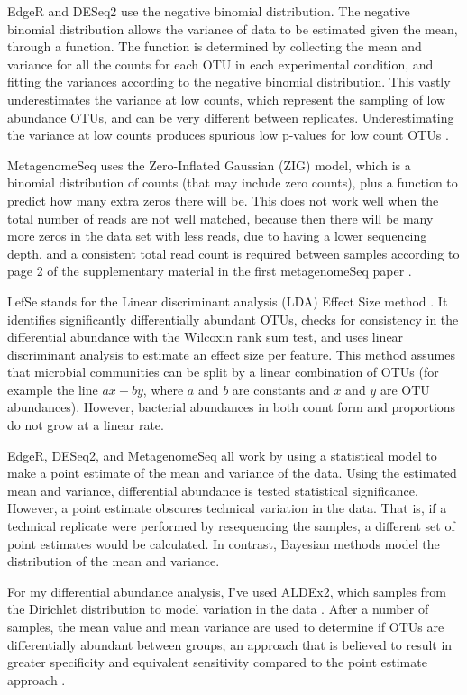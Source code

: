EdgeR and DESeq2 use the negative binomial distribution. The negative binomial distribution allows the variance of data to be estimated given the mean, through a function. The function is determined by collecting the mean and variance for all the counts for each OTU in each experimental condition, and fitting the variances according to the negative binomial distribution. This vastly underestimates the variance at low counts, which represent the sampling of low abundance OTUs, and can be very different between replicates. Underestimating the variance at low counts produces spurious low p-values for low count OTUs \cite{fernandes2013anova}.

MetagenomeSeq uses the Zero-Inflated Gaussian (ZIG) model, which is a binomial distribution of counts (that may include zero counts), plus a function to predict how many extra zeros there will be. This does not work well when the total number of reads are not well matched, because then there will be many more zeros in the data set with less reads, due to having a lower sequencing depth, and a consistent total read count is required between samples according to page 2 of the supplementary material in the first metagenomeSeq paper \cite{paulson2014metagenomeseq}.

LefSe stands for the Linear discriminant analysis (LDA) Effect Size method \cite{segata2011metagenomic}. It identifies significantly differentially abundant OTUs, checks for consistency in the differential abundance with the Wilcoxin rank sum test, and uses linear discriminant analysis to estimate an effect size per feature. This method assumes that microbial communities can be split by a linear combination of OTUs (for example the line $ax + by$, where $a$ and $b$ are constants and $x$ and $y$ are OTU abundances). However, bacterial abundances in both count form and proportions do not grow at a linear rate.

EdgeR, DESeq2, and MetagenomeSeq all work by using a statistical model to make a point estimate of the mean and variance of the data. Using the estimated mean and variance, differential abundance is tested statistical significance. However, a point estimate obscures technical variation in the data. That is, if a technical replicate were performed by resequencing the samples, a different set of point estimates would be calculated. In contrast, Bayesian methods model the distribution of the mean and variance.

For my differential abundance analysis, I’ve used ALDEx2, which samples from the Dirichlet distribution to model variation in the data \cite{fernandes2014unifying}. After a number of samples, the mean value and mean variance are used to determine if OTUs are differentially abundant between groups, an approach that is believed to result in greater specificity and equivalent sensitivity compared to the point estimate approach \cite{fernandes2014unifying}.

